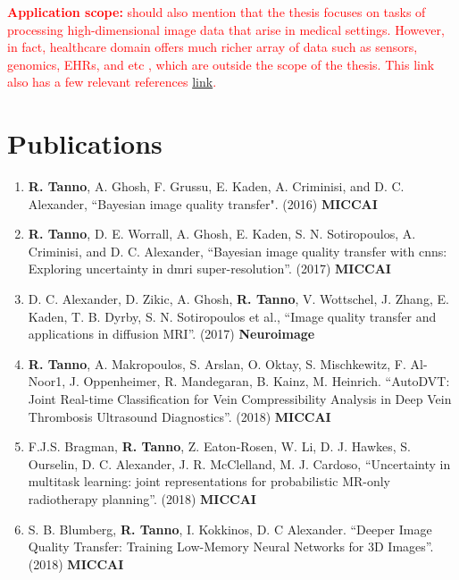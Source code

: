\textcolor{red}{\textbf{Application scope:}  should also mention that the thesis focuses on tasks of processing high-dimensional image data that arise in medical settings. However, in fact, healthcare domain offers much richer array of data such as sensors, genomics, EHRs, and etc \cite{esteva2019guide}, which are outside the scope of the thesis. This link also has a few relevant references \href{https://www.mckinsey.com/industries/pharmaceuticals-and-medical-products/our-insights/machine-learning-and-therapeutics-2-0-avoiding-hype-realizing-potential}{link}.}

\section*{Publications}
\small
\begin{enumerate}
	\item \textbf{R. Tanno}, A. Ghosh, F. Grussu, E. Kaden, A. Criminisi, and D. C. Alexander, “Bayesian image quality transfer". (2016) \textbf{MICCAI}
	
	\item \textbf{R. Tanno}, D. E. Worrall, A. Ghosh, E. Kaden, S. N. Sotiropoulos, A. Criminisi, and D. C. Alexander, “Bayesian image quality transfer with cnns: Exploring uncertainty in dmri super-resolution”. (2017) \textbf{MICCAI}
	
	\item D. C. Alexander, D. Zikic, A. Ghosh, \textbf{R. Tanno}, V. Wottschel, J. Zhang, E. Kaden, T. B. Dyrby, S. N. Sotiropoulos et al., “Image quality transfer and applications in diffusion MRI”.  (2017) \textbf{Neuroimage}
	
	\item \textbf{R. Tanno}, A. Makropoulos, S. Arslan, O. Oktay, S. Mischkewitz, F. Al-Noor1, J. Oppenheimer, R. Mandegaran, B. Kainz, M. Heinrich. ``AutoDVT: Joint Real-time Classification for Vein Compressibility Analysis in Deep Vein Thrombosis Ultrasound Diagnostics''. (2018) \textbf{MICCAI}
	
	\item F.J.S. Bragman, \textbf{R. Tanno}, Z. Eaton-Rosen, W. Li, D. J. Hawkes, S. Ourselin, D. C. Alexander, J. R. McClelland, M. J. Cardoso, ``Uncertainty in multitask learning: joint representations for probabilistic MR-only radiotherapy planning''. (2018) \textbf{MICCAI}
	
	\item S. B. Blumberg, \textbf{R. Tanno}, I. Kokkinos, D. C Alexander. ``Deeper Image Quality Transfer: Training Low-Memory Neural Networks for 3D Images''. (2018) \textbf{MICCAI }
	

\end{enumerate}

